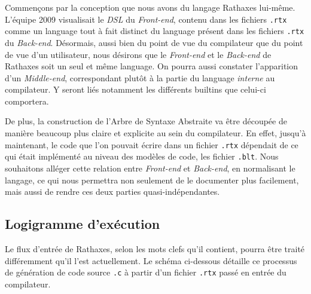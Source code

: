 \documentclass{rtxreport}
\begin{document}
Commençons par la conception que nous avons du langage Rathaxes
lui-même. L'équipe 2009 visualisait le \emph{DSL} du \emph{Front-end},
contenu dans les fichiers \texttt{.rtx} comme un language tout à fait
distinct du language présent dans les fichiers \texttt{.rtx} du
\emph{Back-end}. Désormais, aussi bien du point de vue du compilateur que
du point de vue d'un utilisateur, nous désirons que le \emph{Front-end} et
le \emph{Back-end} de Rathaxes soit un seul et même language. On pourra
aussi constater l'apparition d'un \emph{Middle-end}, correspondant plutôt
à la partie du language \emph{interne} au compilateur. Y seront liés
notamment les différents builtins que celui-ci comportera.

De plus, la construction de l'Arbre de Syntaxe Abstraite va être
découpée de manière beaucoup plus claire et explicite au sein du
compilateur.
En effet, jusqu'à maintenant, le code que l'on pouvait écrire dans un
fichier \texttt{.rtx} dépendait de ce qui était implémenté au
niveau des modèles de code, les fichier \texttt{.blt}. Nous souhaitons
alléger cette relation entre \emph{Front-end} et \emph{Back-end}, en
normalisant le langage, ce qui nous permettra non seulement de le documenter
plus facilement, mais aussi de rendre ces deux parties quasi-indépendantes.

\subsection{Logigramme d'exécution}

Le flux d'entrée de Rathaxes, selon les mots clefs qu'il contient,
pourra être traité différemment qu'il l'est actuellement.
Le schéma ci-dessous détaille ce processus de génération de code source
\texttt{.c} à partir d'un fichier \texttt{.rtx} passé en entrée du
compilateur.
\end{document}
